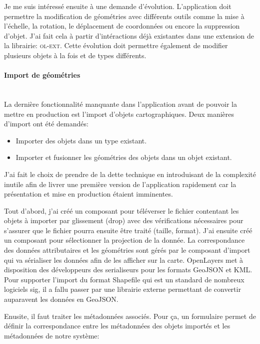 \documentclass{rapportUHA40}
\begin{document}
Je me suis intéressé ensuite à une demande d'évolution. L'application doit
permettre la modification de géométries avec différents outils comme la mise à
l'échelle, la rotation, le déplacement de coordonnées ou encore la suppression
d'objet. J'ai fait cela à partir d'intéractions déjà existantes dans une
extension de la librairie: \textsc{ol-ext}. Cette évolution doit permettre
également de modifier plusieurs objets à la fois et de types différents.

\paragraph{Import de géométries}\mbox{}\\
La dernière fonctionnalité manquante dans l'application avant de pouvoir la
mettre en production est l'import d'objets cartographiques. Deux manières d'import
ont été demandés:
\begin{itemize}
  \item Importer des objets dans un type existant.
  \item Importer et fusionner les géométries des objets dans un objet existant.
\end{itemize}

J'ai fait le choix de prendre de la dette technique en introduisant de la
complexité inutile afin de livrer une première version de l'application
rapidement car la présentation et mise en production étaient imminentes.

Tout d'abord, j'ai créé un composant pour téléverser le fichier contentant les
objets à importer par glissement (drop) avec des vérifications nécessaires pour
s'assurer que le fichier pourra ensuite être traité (taille, format). J'ai
ensuite créé un composant pour sélectionner la projection de la donnée. La
correspondance des données attributaires et les géométries sont gérés par le
composant d'import qui va sérialiser les données afin de les afficher sur la
carte. OpenLayers met à disposition des développeurs des serialiseurs pour les
formats GeoJSON et KML\@. Pour supporter l'import du format Shapefile qui est
un standard de nombreux logiciels \gls{sig}, il a fallu passer par une
librairie externe permettant de convertir auparavent les données en GeoJSON\@.

Enusite, il faut traiter les métadonnées associés. Pour ça, un formulaire
permet de définir la correspondance entre les métadonnées des objets importés
et les métadonnées de notre système:
\end{document}
